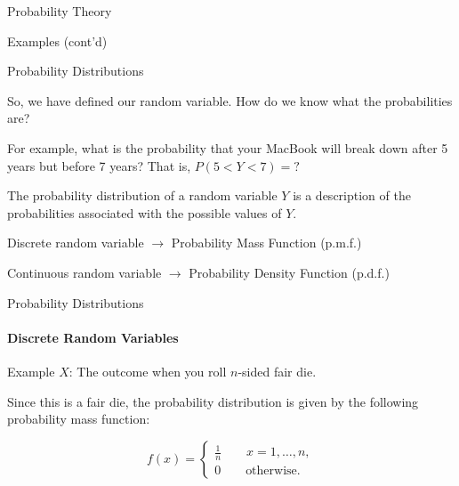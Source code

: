 \documentclass{beamer}\usepackage[]{graphicx}\usepackage[]{color}
\begin{document}
\begin{darkframes}
\begin{frame}[label=lists]{Probability Theory}
\begin{exampleblock}{Examples (cont'd)}
\begin{itemize}
			\end{itemize}
        \end{exampleblock}
  
	\end{frame}  	
	
	
  
  
  
  
  
	\begin{frame}[label=lists]{Probability Distributions}
	
		So, we have defined our random variable. How do we know what the probabilities are? \newline
		
		For example, what is the probability that your MacBook will break down after 5 years but before 7 years? That is, $P(5<Y<7)=?$\newline
  
		
      	\begin{definition}
       		The \alert{probability distribution} of a random variable $Y$ is a description of the probabilities associated with the possible values of $Y$. 
			\newline       		
       		
       		Discrete random variable $\rightarrow$ Probability Mass Function (p.m.f.)
       		
       		Continuous random variable $\rightarrow$ Probability Density Function (p.d.f.)

      	\end{definition}
    
    
		
  
	\end{frame}  	
	  
  
  




	\begin{frame}[label=lists]{Probability Distributions}
		\framesubtitle{Discrete Random Variables} 
	
		\begin{exampleblock}{Example}
			$X$: The outcome when you roll $n$-sided fair die.
			
			Since this is a fair die, the probability distribution is given by the following probability mass function:
			
			$$ f(x) = 
			\begin{cases}
				\frac{1}{n} \qquad x= 1,\ldots,n, \\
				0 \qquad   \text{otherwise.}
			\end{cases}
			$$
        \end{exampleblock}
        

\end{frame}
\end{darkframes}
\end{document}
